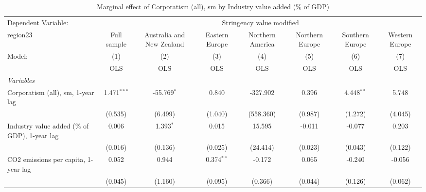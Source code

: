 
\begin{table}[htbp]
   \caption{Marginal effect of Corporatism (all), sm by Industry value added (\% of GDP)}
   \centering
   \begin{tabular}{lccccccc}
      \toprule
      Dependent Variable: & \multicolumn{7}{c}{Stringency value modified}\\
      region23                                                                          & Full sample   & Australia and New Zealand & Eastern Europe & Northern America & Northern Europe & Southern Europe & Western Europe \\   
      Model:                                                                            & (1)           & (2)                       & (3)            & (4)              & (5)             & (6)             & (7)\\  
                                                                                        &  OLS          & OLS                       & OLS            & OLS              & OLS             & OLS             & OLS\\  
      \midrule
      \emph{Variables}\\
      Corporatism (all), sm, 1-year lag                                                 & 1.471$^{***}$ & -55.769$^{*}$             & 0.840          & -327.902         & 0.396           & 4.448$^{**}$    & 5.748\\   
                                                                                        & (0.535)       & (6.499)                   & (1.040)        & (558.360)        & (0.987)         & (1.272)         & (4.045)\\   
      Industry value added (\% of GDP), 1-year lag                                      & 0.006         & 1.393$^{*}$               & 0.015          & 15.595           & -0.011          & -0.077          & 0.203\\   
                                                                                        & (0.016)       & (0.136)                   & (0.025)        & (24.414)         & (0.023)         & (0.043)         & (0.122)\\   
      CO2 emissions per capita, 1-year lag                                              & 0.052         & 0.944                     & 0.374$^{**}$   & -0.172           & 0.065           & -0.240          & -0.056\\   
                                                                                        & (0.045)       & (1.160)                   & (0.095)        & (0.366)          & (0.044)         & (0.126)         & (0.062)\\   

\end{tabular}
\end{table}
